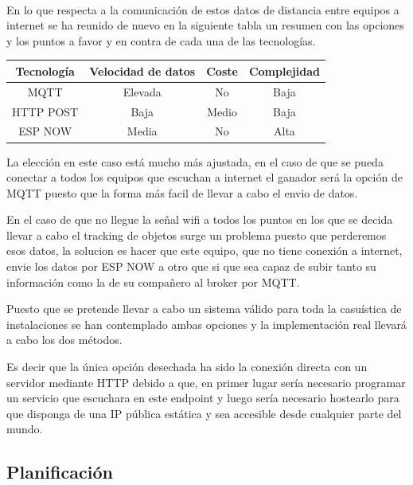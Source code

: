 \documentclass[a4paper ,12pt, onecolumn]{article}
\begin{document}
        \paragraph{}
        En lo que respecta a la comunicación de estos datos de distancia entre equipos a internet se ha reunido de nuevo en la 
        siguiente tabla un resumen con las opciones y los puntos a favor y en contra de cada una de las tecnologías.
        \begin{center}
            \begin{tabular}{||c | c| c| c||} 
            \hline
            Tecnología  & Velocidad de datos & Coste & Complejidad \\ [0.5ex] 
            \hline
            MQTT& Elevada  & No & Baja\\
            HTTP POST& Baja & Medio & Baja\\ 
            ESP NOW& Media & No & Alta\\ 
            \hline
            \end{tabular}
        \end{center}   
        La elección en este caso está mucho más ajustada, en el caso de que se pueda conectar a todos los equipos que 
        escuchan a internet el ganador será la opción de MQTT puesto que la forma más facil de llevar a cabo el envio de datos.

        En el caso de que no llegue la señal wifi a todos los puntos en los que se decida llevar a cabo el tracking de objetos 
        surge un problema puesto que perderemos esos datos, la solucion es hacer que este equipo, que no tiene conexión a internet,
        envie los datos por ESP NOW a otro que si que sea capaz de subir tanto su información como la de su compañero al broker por MQTT.

        Puesto que se pretende llevar a cabo un sistema válido para toda la casuística de instalaciones se han contemplado ambas opciones
        y la implementación real llevará a cabo los dos métodos.
        
        Es decir que la única opción desechada ha sido la conexión directa con un servidor mediante HTTP debido a que, en primer
        lugar sería necesario programar un servicio que escuchara en este endpoint y luego sería necesario hostearlo 
        para que disponga de una IP pública estática y sea accesible desde cualquier parte del mundo.
    \subsection{Planificación}
\end{document}
